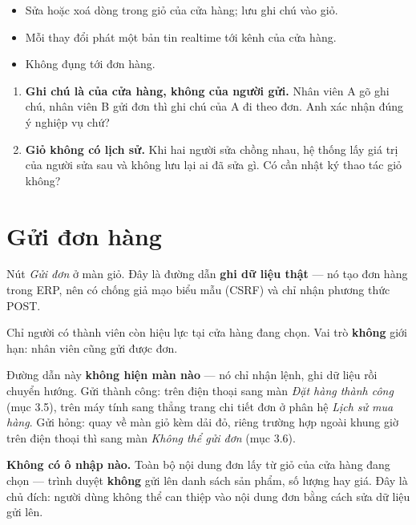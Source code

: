 \mghi

\begin{itemize}[leftmargin=*]
  \item Sửa hoặc xoá dòng trong giỏ của cửa hàng; lưu ghi chú vào giỏ.
  \item Mỗi thay đổi phát một bản tin realtime tới kênh của cửa hàng.
  \item Không đụng tới đơn hàng.
\end{itemize}

\mhoi

\begin{ask}
\begin{enumerate}[leftmargin=*]
  \item \textbf{Ghi chú là của cửa hàng, không của người gửi.} Nhân viên A gõ ghi chú, nhân
        viên B gửi đơn thì ghi chú của A đi theo đơn. Anh xác nhận đúng ý nghiệp vụ chứ?
  \item \textbf{Giỏ không có lịch sử.} Khi hai người sửa chồng nhau, hệ thống lấy giá trị của
        người sửa sau và không lưu lại ai đã sửa gì. Có cần nhật ký thao tác giỏ không?
\end{enumerate}
\end{ask}

\section{Gửi đơn hàng}
\medskip

\mvao

Nút \emph{Gửi đơn} ở màn giỏ. Đây là đường dẫn \textbf{ghi dữ liệu thật} --- nó tạo đơn hàng
trong ERP, nên có chống giả mạo biểu mẫu (CSRF) và chỉ nhận phương thức POST.

\mai

Chỉ người có thành viên còn hiệu lực tại cửa hàng đang chọn. Vai trò \textbf{không} giới hạn:
nhân viên cũng gửi được đơn.

\mhien

Đường dẫn này \textbf{không hiện màn nào} --- nó chỉ nhận lệnh, ghi dữ liệu rồi chuyển hướng.
Gửi thành công: trên điện thoại sang màn \emph{Đặt hàng thành công} (mục 3.5), trên máy tính sang
thẳng trang chi tiết đơn ở phân hệ \emph{Lịch sử mua hàng}. Gửi hỏng: quay về màn giỏ kèm dải đỏ,
riêng trường hợp ngoài khung giờ trên điện thoại thì sang màn \emph{Không thể gửi đơn} (mục 3.6).

\mloc

\textbf{Không có ô nhập nào.} Toàn bộ nội dung đơn lấy từ giỏ của cửa hàng đang chọn --- trình
duyệt \textbf{không} gửi lên danh sách sản phẩm, số lượng hay giá. Đây là chủ đích: người dùng
không thể can thiệp vào nội dung đơn bằng cách sửa dữ liệu gửi lên.

